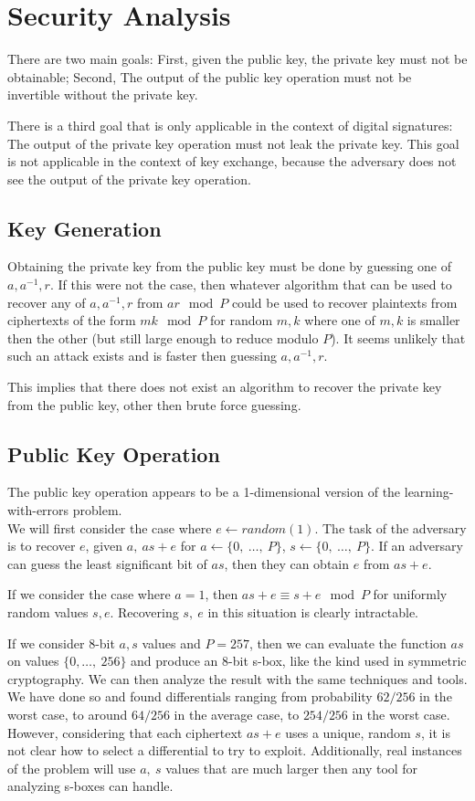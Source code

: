 \documentclass[preprint]{iacrtrans}
\begin{document}
\section{Security Analysis}
There are two main goals: First, given the public key, the private key must not be obtainable; Second, The output of the public key operation must not be invertible without the private key.

There is a third goal that is only applicable in the context of digital signatures: The output of the private key operation must not leak the private key. This goal is not applicable in the context of key exchange, because the adversary does not see the output of the private key operation.

\subsection{Key Generation}
Obtaining the private key from the public key must be done by guessing one of $a, a^{-1}, r$. If this were not the case, then whatever algorithm that can be used to recover any of $a, a^{-1}, r$ from $a r \mod P$ could be used to recover plaintexts from ciphertexts of the form $m k \mod P$ for random $m, k$ where one of $m, k$ is smaller then the other (but still large enough to reduce modulo $P$). It seems unlikely that such an attack exists and is faster then guessing $a, a^{-1},  r$. 

This implies that there does not exist an algorithm to recover the private key from the public key, other then brute force guessing.

\subsection{Public Key Operation}
The public key operation appears to be a 1-dimensional version of the learning-with-errors problem.\\

We will first consider the case where $e \leftarrow random(1)$. The task of the adversary is to recover $e$, given $a,\ a s + e$ for $a \leftarrow \{0,\ \dots,\ P\}$, $s \leftarrow \{0,\ \dots,\ P\}$. If an adversary can guess the least significant bit of $a s$, then they can obtain $e$ from $a s + e$.

If we consider the case where $a = 1$, then $a s + e \equiv s + e \mod P$ for uniformly random values $s, e$. Recovering $s,\ e$ in this situation is clearly intractable.

If we consider 8-bit $a, s$ values and $P = 257$, then we can evaluate the function $a s$ on values $\{0,\dots,\ 256\}$ and produce an 8-bit s-box, like the kind used in symmetric cryptography. We can then analyze the result with the same techniques and tools. We have done so and found differentials ranging from probability $62/256$ in the worst case, to around $64/256$ in the average case, to $254/256$ in the worst case. However, considering that each ciphertext $a s + e$ uses a unique, random $s$, it is not clear how to select a differential to try to exploit. Additionally, real instances of the problem will use $a,\ s$ values that are much larger then any tool for analyzing s-boxes can handle.
\end{document}
